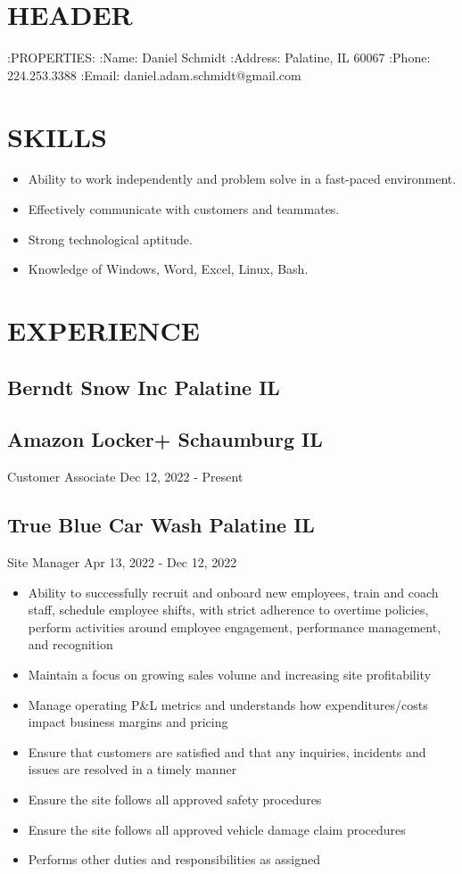 \documentclass[11pt]{article}
\author{Dan Schmidt}
\date{\today}
\title{}
\begin{document}
\tableofcontents

\section{HEADER}
\label{sec:orgcaaced2}
:PROPERTIES:
:Name: Daniel Schmidt
:Address: Palatine, IL 60067
:Phone: 224.253.3388
:Email: daniel.adam.schmidt@gmail.com

\section{SKILLS}
\label{sec:org7be7b5d}
\begin{itemize}
\item Ability to work independently and problem solve in a fast-paced environment.
\item Effectively communicate with customers and teammates.
\item Strong technological aptitude.
\item Knowledge of Windows, Word, Excel, Linux, Bash.
\end{itemize}

\section{EXPERIENCE}
\label{sec:org7a0fddc}
\subsection{Berndt Snow Inc Palatine IL}
\label{sec:orgb1a581a}

\subsection{Amazon Locker+  Schaumburg IL}
\label{sec:orgbbe2de3}
Customer Associate Dec 12, 2022 - Present 

\subsection{True Blue Car Wash Palatine IL}
\label{sec:org591ff14}
Site Manager Apr 13, 2022 - Dec 12, 2022
\begin{itemize}
\item Ability to successfully recruit and onboard new employees, train and coach staff, schedule employee shifts, with strict adherence to overtime policies, perform activities around employee engagement, performance management, and recognition
\item Maintain a focus on growing sales volume and increasing site profitability
\item Manage operating P\&L metrics and understands how expenditures/costs impact business margins and pricing
\item Ensure that customers are satisfied and that any inquiries, incidents and issues are resolved in a timely manner
\item Ensure the site follows all approved safety procedures
\item Ensure the site follows all approved vehicle damage claim procedures
\item Performs other duties and responsibilities as assigned
\end{itemize}
\end{document}
